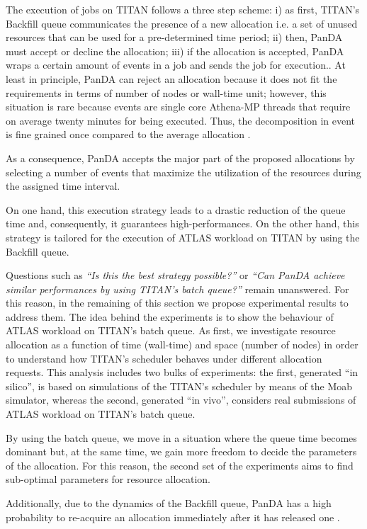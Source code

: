 The execution of jobs on TITAN follows a three step scheme: i) as first, TITAN's Backfill queue communicates the presence of a new allocation i.e. a set of unused resources that can be used for a pre-determined time period; ii) then, PanDA must accept or decline the allocation; iii) if the allocation is accepted, PanDA wraps a certain amount of events in a job and sends the job for execution..
At least in principle, PanDA can reject an allocation because it does not fit the requirements in terms of number of nodes or wall-time unit; however, this situation is rare because events are single core Athena-MP threads that require on average twenty minutes for being executed. Thus, the decomposition in event is fine grained once compared to the average allocation . 

As a consequence, PanDA accepts the major part of the proposed allocations by selecting a number of events that maximize the utilization of the resources during the assigned time interval.  

On one hand, this execution strategy leads to a drastic reduction of the queue time and, consequently, it guarantees high-performances. On the other hand, this strategy is tailored for the execution of ATLAS workload on TITAN by using the Backfill queue.

Questions such as \emph{``Is this the best strategy possible?''} or \emph{``Can PanDA achieve similar performances by using TITAN's batch queue?''}  remain unanswered.
For this reason, in the remaining of this section we propose experimental results to address them. The idea behind the experiments is to show the behaviour of ATLAS workload on TITAN's batch queue.  
As first, we investigate resource allocation as a function of time (wall-time) and space (number of nodes) in order to understand how TITAN's scheduler behaves under different allocation requests. This analysis includes two bulks of experiments: the first, generated ``in silico'', is based on simulations of the TITAN's scheduler by means of the Moab simulator, whereas the second, generated ``in vivo'',  considers real submissions of ATLAS workload on TITAN's batch queue.

By using the batch queue, we move in a situation where the queue time becomes dominant but, at the same time, we gain more freedom to decide the parameters of the allocation. For this reason, the second set of the experiments aims to find sub-optimal parameters for resource allocation. 
  

Additionally, due to the dynamics of the Backfill queue, PanDA has a high probability to re-acquire an allocation immediately after it has released one . 


